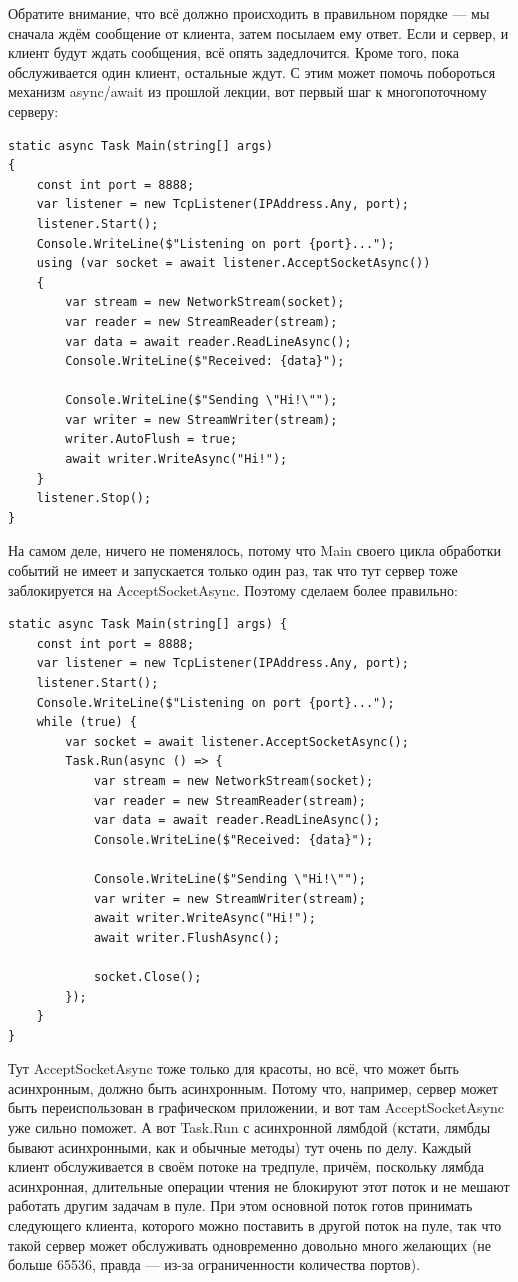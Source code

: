 \documentclass{../../text-style}
\begin{document}
Обратите внимание, что всё должно происходить в правильном порядке --- мы сначала ждём сообщение от клиента, затем посылаем ему ответ. Если и сервер, и клиент будут ждать сообщения, всё опять задедлочится. Кроме того, пока обслуживается один клиент, остальные ждут. С этим может помочь побороться механизм async/await из прошлой лекции, вот первый шаг к многопоточному серверу:

\begin{verbatim}
static async Task Main(string[] args)
{
    const int port = 8888;
    var listener = new TcpListener(IPAddress.Any, port);
    listener.Start();
    Console.WriteLine($"Listening on port {port}...");
    using (var socket = await listener.AcceptSocketAsync())
    {
        var stream = new NetworkStream(socket);
        var reader = new StreamReader(stream);
        var data = await reader.ReadLineAsync();
        Console.WriteLine($"Received: {data}");

        Console.WriteLine($"Sending \"Hi!\"");
        var writer = new StreamWriter(stream);
        writer.AutoFlush = true;
        await writer.WriteAsync("Hi!");
    }
    listener.Stop();
}
\end{verbatim}

На самом деле, ничего не поменялось, потому что Main своего цикла обработки событий не имеет и запускается только один раз, так что тут сервер тоже заблокируется на AcceptSocketAsync. Поэтому сделаем более правильно:

\begin{verbatim}
static async Task Main(string[] args) {
    const int port = 8888;
    var listener = new TcpListener(IPAddress.Any, port);
    listener.Start();
    Console.WriteLine($"Listening on port {port}...");
    while (true) {
        var socket = await listener.AcceptSocketAsync();
        Task.Run(async () => {
            var stream = new NetworkStream(socket);
            var reader = new StreamReader(stream);
            var data = await reader.ReadLineAsync();
            Console.WriteLine($"Received: {data}");

            Console.WriteLine($"Sending \"Hi!\"");
            var writer = new StreamWriter(stream);
            await writer.WriteAsync("Hi!");
            await writer.FlushAsync();

            socket.Close();
        });
    }
}
\end{verbatim}

Тут AcceptSocketAsync тоже только для красоты, но всё, что может быть асинхронным, должно быть асинхронным. Потому что, например, сервер может быть переиспользован в графическом приложении, и вот там AcceptSocketAsync уже сильно поможет. А вот Task.Run с асинхронной лямбдой (кстати, лямбды бывают асинхронными, как и обычные методы) тут очень по делу. Каждый клиент обслуживается в своём потоке на тредпуле, причём, поскольку лямбда асинхронная, длительные операции чтения не блокируют этот поток и не мешают работать другим задачам в пуле. При этом основной поток готов принимать следующего клиента, которого можно поставить в другой поток на пуле, так что такой сервер может обслуживать одновременно довольно много желающих (не больше 65536, правда --- из-за ограниченности количества портов).
\end{document}
